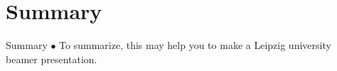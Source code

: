 \section{Summary}
\begin{frame}{Summary}
    $\bullet$ To summarize, this may help you to make a Leipzig university beamer presentation.
\end{frame}